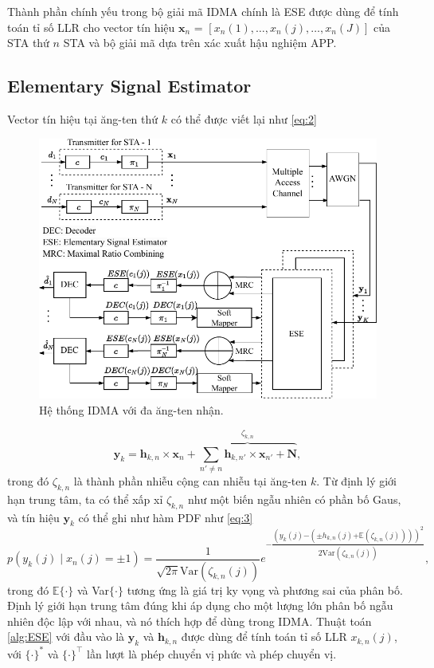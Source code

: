 Thành phần chính yếu trong bộ giải mã IDMA chính là \acrfull{ESE} được dùng để tính toán tỉ số \acrfull{LLR} cho vector tín hiệu $\mathbf{x}_n $ = $[x_n(1),\dots,x_n(j),\dots,x_n(J)]$ của STA thứ $n$ STA và bộ giải mã dựa trên xác xuất hậu nghiệm \acrfull{APP}.

\subsection{Elementary Signal Estimator} \label{sub2.1}

Vector tín hiệu tại ăng-ten thứ $k$ có thể được viết lại như \eqref{eq:2}

\begin{figure}
	\centering
	\includegraphics[width = 0.75\linewidth]{figure/Chap2/IDMA_Tx_Rx_structure-2_k2opt.pdf}
	\caption{Hệ thống IDMA với đa ăng-ten nhận.}
	\vspace{-1em}
	\label{fig:IDMASystem}
\end{figure}

\begin{equation}
	\mathbf{y}_k = \mathbf{h}_{k,n} \times \mathbf{x}_n
	+ \overbrace{\sum_{n' \neq n}\mathbf{h}_{k,n'} \times \mathbf{x}_{n'}
		+ \mathbf{N}}^{\zeta_{k,n}},
	\label{eq:2}
\end{equation}%
trong đó $\zeta_{k,n}$ là thành phần nhiễu cộng can nhiễu tại ăng-ten $k$. Từ định lý giới hạn trung tâm, ta có thể xấp xỉ $\zeta_{k,n}$ như một biến ngẫu nhiên có phần bố Gaus, và tín hiệu $\mathbf{y}_k$ có thể ghi như hàm PDF như \eqref{eq:3}
\begin{equation}
	p(y_k(j)\mid x_n(j)=\pm 1) =
	\frac{1}{\sqrt{2\pi}\text{Var}(\zeta_{k,n}(j))}
	e^{\mathord{-}\dfrac{(y_k(j)\mathord{-}(\pm h_{k,n}(j)\mathord{+}\mathbb{E}(\zeta_{k,n}(j))))^2}{2\text{Var}(\zeta_{k,n}(j))}},
	\label{eq:3}
\end{equation}
trong đó $\mathbb{E}\{\cdot\}$ và Var$\{\cdot\}$ tương ứng là giá trị ky vọng và phương sai của phân bố. Định lý giới hạn trung tâm đúng khi áp dụng cho một lượng lớn phân bố ngẫu nhiên độc lập với nhau, và nó thích hợp để dùng trong IDMA. Thuật toán \ref{alg:ESE} với đầu vào là $\mathbf{y}_k$ và $\mathbf{h}_{k,n}$ được dùng để tính toán tỉ số LLR $x_{k,n}(j)$, với $\{\cdot\}^*$ và $\{\cdot\}^\top$ lần lượt là phép chuyển vị phức và phép chuyển vị.

